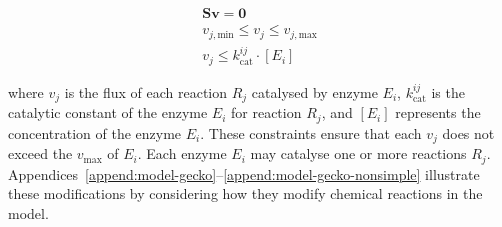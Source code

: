 \begin{equation}
  \begin{gathered}
    \mathbf{S} \mathbf{v} = \mathbf{0}\\
    v_{j,\mathrm{min}} \leq v_{j} \leq v_{j,\mathrm{max}}\\
    v_{j} \leq k_{\mathrm{cat}}^{ij} \cdot [E_{i}]
  \end{gathered}
  \label{eq:model-gecko-fba-constraints}
\end{equation}

where $v_{j}$ is the flux of each reaction $R_{j}$ catalysed by enzyme $E_{i}$, $k_{\mathrm{cat}}^{ij}$ is the catalytic constant of the enzyme $E_{i}$ for reaction $R_{j}$, and $[E_{i}]$ represents the concentration of the enzyme $E_{i}$.
These constraints ensure that each $v_{j}$ does not exceed the $v_{\mathrm{max}}$ of $E_{i}$.
Each enzyme $E_{i}$ may catalyse one or more reactions $R_{j}$.
Appendices~\ref{append:model-gecko}--\ref{append:model-gecko-nonsimple} illustrate these modifications by considering how they modify chemical reactions in the model.






